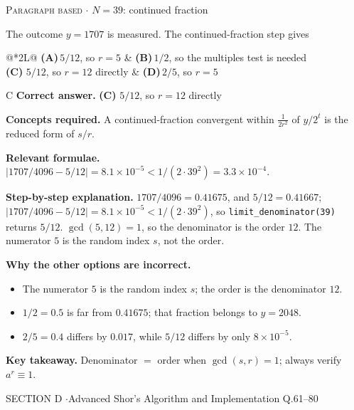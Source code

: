 \documentclass[11pt,a4paper]{article}
\newcommand{\optlabel}[1]{\textbf{(#1)}}
\newcommand{\correctlabel}[1]{\textcolor{okgreen}{\textbf{(#1)}\,\ding{51}}}
\newenvironment{qitem}[1]{\begin{list}{}{\setlength{\leftmargin}{3.3em}\setlength{\labelwidth}{3.1em}%
  \setlength{\labelsep}{0.2em}\setlength{\topsep}{3pt}\setlength{\parsep}{3pt}}\item[\textbf{Q.#1}\hfill]}{\end{list}}
\newcommand{\qsep}{\par\vspace{2pt}{\color{black!15}\hrule}\vspace{4pt}}
\newcommand{\qmeta}[2]{{\footnotesize\color{black!60}\textsc{#1} \;$\cdot$\; #2}\par}
\begin{document}
\begin{qitem}{60}
\qmeta{Paragraph based}{$N = 39$: continued fraction}
The outcome $y = 1707$ is measured. The continued-fraction step gives
\par\smallskip\noindent\begin{tabularx}{\linewidth}{@{}*{2}{L}@{}}
\optlabel{A}\,$5/12$, so $r = 5$ & \optlabel{B}\,$1/2$, so the multiples test is needed \\[3pt]
\correctlabel{C}\,$5/12$, so $r = 12$ directly & \optlabel{D}\,$2/5$, so $r = 5$
\end{tabularx}
\end{qitem}
\begin{solbox}{C}
\textbf{\color{brand}Correct answer.} \textcolor{okgreen}{\textbf{(C)}} $5/12$, so $r = 12$ directly

\textbf{\color{brand}Concepts required.} A continued-fraction convergent within $\frac{1}{2r^2}$ of $y/2^t$ is the reduced form of $s/r$.

\textbf{\color{brand}Relevant formulae.} $|1707/4096 - 5/12| = 8.1\times10^{-5} < 1/(2\cdot39^2) = 3.3\times10^{-4}$.

\textbf{\color{brand}Step-by-step explanation.} $1707/4096 = 0.41675$, and $5/12 = 0.41667$; $|1707/4096 - 5/12| = 8.1\times10^{-5} < 1/(2\cdot39^2)$, so \texttt{limit\_denominator(39)} returns $5/12$.
$\gcd(5, 12) = 1$, so the denominator is the order $12$. The numerator $5$ is the random index $s$, not the order.

\textbf{\color{brand}Why the other options are incorrect.}
\begin{itemize}[leftmargin=2.4em, itemsep=1pt, topsep=2pt]
\item[\textbf{(A)}] The numerator $5$ is the random index $s$; the order is the denominator $12$.
\item[\textbf{(B)}] $1/2 = 0.5$ is far from $0.41675$; that fraction belongs to $y = 2048$.
\item[\textbf{(D)}] $2/5 = 0.4$ differs by $0.017$, while $5/12$ differs by only $8\times10^{-5}$.
\end{itemize}
\textbf{\color{brand}Key takeaway.} Denominator $=$ order when $\gcd(s, r) = 1$; always verify $a^r \equiv 1$.
\end{solbox}
\qsep

\newpage

\begin{sectionbanner}SECTION D \enspace$\cdot$\enspace Advanced Shor's Algorithm and Implementation \hfill Q.61--80\end{sectionbanner}
\end{document}
